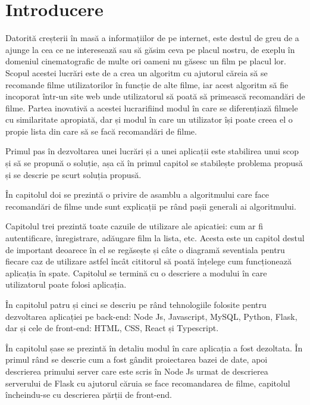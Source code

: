 \chapter{Introducere }
\par  Datorită creșterii în masă a informațiilor de pe internet, este destul de greu de a ajunge la cea ce ne interesează sau să găsim ceva pe placul nostru, de exeplu în domeniul cinematografic de multe ori oameni nu găsesc un film pe placul lor. Scopul acestei lucrări este de a crea un algoritm cu ajutorul căreia să se recomande filme utilizatorilor în funcție de alte filme, iar  acest algoritm să fie incoporat într-un site web unde utilizatorul să poată să primească recomandări de filme. Partea inovativă a acestei lucrarifiind modul în care se diferențiază filmele cu similaritate apropiată, dar și modul în care un utilizator își poate creea el o propie lista din care să se facă recomandări de filme.

\par Primul pas în dezvoltarea unei lucrări și a unei aplicații este  stabilirea unui scop și să se propună o soluție, așa că în primul capitol se stabilește problema propusă și se descrie pe scurt soluția propusă.

\par În capitolul doi se prezintă o privire de asamblu a algoritmului care face recomandări de filme unde sunt explicații pe rând pașii generali ai algoritmului.


\par Capitolul trei prezintă toate cazuile de utilizare ale apicatiei: cum ar fi autentificare, înregistrare, adăugare film la lista, etc. Acesta este un capitol destul de important deoarece în el se regăsește și câte o diagramă seventiala pentru fiecare caz de utilizare astfel încât cititorul să poată înțelege cum funcționează aplicația în spate. Capitolul se termină cu o descriere a modului în care utilizatorul poate folosi aplicația.

\par În capitolul patru și cinci se descriu pe rând tehnologiile folosite pentru dezvoltarea aplicației pe back-end: Node Js, Javascript, MySQL, Python, Flask, dar și cele de front-end: HTML, CSS, React și Typescript.

\par În capitolul șase se prezintă în detaliu modul în care aplicația a fost dezoltata. În primul rând se descrie cum a fost gândit proiectarea bazei de date, apoi descrierea primului server care este scris în Node Js urmat de descrierea serverului de Flask cu ajutorul căruia se face recomandarea de filme, capitolul încheindu-se cu descrierea părții de front-end.

